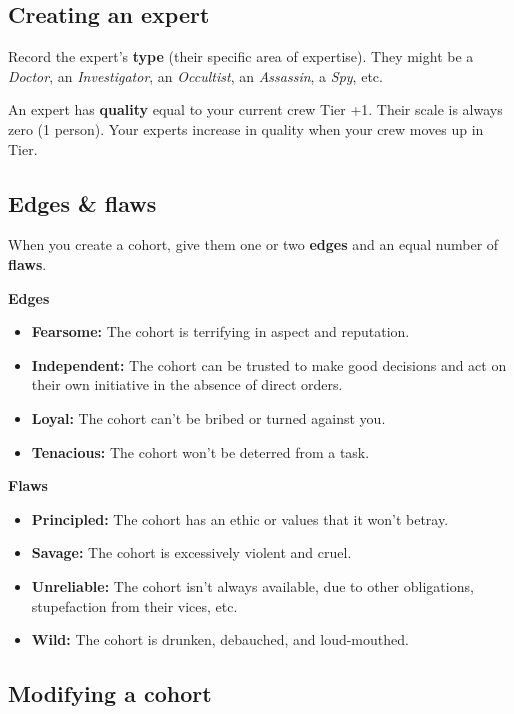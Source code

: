 \documentclass[11pt,fleqn,a5paper]{book}
\begin{document}
\subsection{Creating an expert}

Record the expert’s \textbf{type} (their specific area of expertise). They might be a \emph{Doctor}, an \emph{Investigator}, an \emph{Occultist}, an \emph{Assassin}, a \emph{Spy}, etc.

An expert has \textbf{quality} equal to your current crew Tier +1. Their scale is always zero (1 person). Your experts increase in quality when your crew moves up in Tier.

\subsection{Edges \& flaws}

When you create a cohort, give them one or two \textbf{edges} and an equal number of \textbf{flaws}.

\textbf{Edges}

\begin{itemize}
	\item \textbf{Fearsome: }The cohort is terrifying in aspect and reputation.
	\item \textbf{Independent:} The cohort can be trusted to make good decisions and act on their own initiative in the absence of direct orders.
	\item \textbf{Loyal:} The cohort can’t be bribed or turned against you.
	\item \textbf{Tenacious:} The cohort won’t be deterred from a task.
\end{itemize}

\textbf{Flaws}

\begin{itemize}
	\item \textbf{Principled:} The cohort has an ethic or values that it won’t betray.
	\item \textbf{Savage:} The cohort is excessively violent and cruel.
	\item \textbf{Unreliable:} The cohort isn’t always available, due to other obligations, stupefaction from their vices, etc.
	\item \textbf{Wild:} The cohort is drunken, debauched, and loud-mouthed.
\end{itemize}

\subsection{Modifying a cohort}
\end{document}
